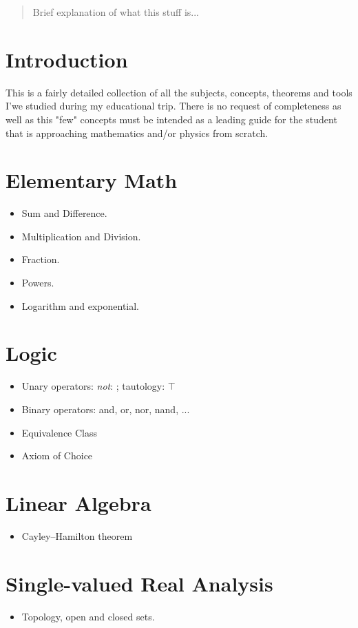 \documentclass[10pt]{article}
\begin{document}
\begin{abstract}
Brief explanation of what this stuff is... 
\end{abstract}
\section*{Introduction}
This is a fairly detailed collection of all the subjects, concepts, theorems and tools I'we studied during my educational trip. There is no request of completeness as well as this "few" concepts must be intended as a leading guide for the student that is approaching mathematics and/or physics from scratch.
\section{Elementary Math}
\begin{itemize}
	\item Sum and Difference.
	\item Multiplication and Division.
	\item Fraction.
	\item Powers.
	\item Logarithm and exponential.
\end{itemize}

\section{Logic}
\begin{itemize}
	\item Unary operators: \emph{not}: \textlnot  ; tautology: $ \top $	 
	\item Binary operators: and, or, nor, nand, ...
	\item Equivalence Class
	\item Axiom of Choice
\end{itemize}

\section{Linear Algebra}
\begin{itemize}
	\item Cayley–Hamilton theorem
\end{itemize}

\section{Single-valued Real Analysis}
\begin{itemize}
	\item Topology, open and closed sets.
\end{itemize}
\end{document}
